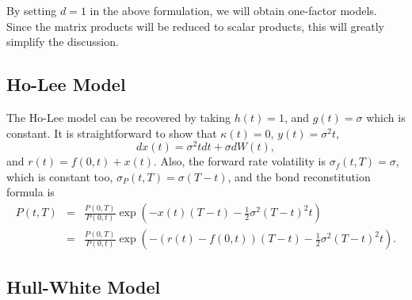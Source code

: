 \documentclass[12pt]{article}
\begin{document}
  By setting $d=1$ in the above formulation, we will obtain one-factor models. Since the matrix products will be reduced to
  scalar products, this will greatly simplify the discussion.

  \subsection{Ho-Lee Model}

  The Ho-Lee model can be recovered by taking $h(t)=1$, and $g(t)=\sigma$ which is constant. It is straightforward to show that
  $\kappa(t)=0$, $y(t)=\sigma^2t$,
  \begin{equation}
    dx(t)=\sigma^2tdt+\sigma dW(t),
  \end{equation}
  and $r(t)=f(0,t)+x(t)$. Also, the forward rate volatility is $\sigma_f(t,T)=\sigma$, which is constant too, $\sigma_P(t,T)=\sigma(T-t)$, and the bond
  reconstitution formula is
  \begin{eqnarray}
    P(t,T)&=&\frac{P(0,T)}{P(0,t)}\exp\left(-x(t)(T-t)-\frac{1}{2}\sigma^2(T-t)^2t\right)\nonumber\\
          &=&\frac{P(0,T)}{P(0,t)}\exp\left(-\left(r(t)-f(0,t)\right)(T-t)-\frac{1}{2}\sigma^2(T-t)^2t\right).
  \end{eqnarray}


  \subsection{Hull-White Model}
\end{document}

